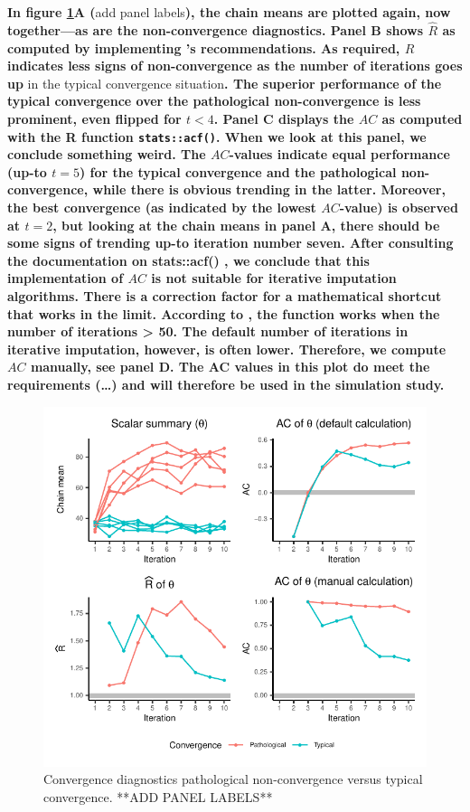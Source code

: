 \documentclass[Royal,times,sageh]{sagej}
\begin{document}
\textbf{In figure \ref{fig:diagnostics}A (}add panel labels\textbf{),
the chain means are plotted again, now together---as are the
non-convergence diagnostics. Panel B shows \(\widehat{R}\) as computed
by implementing \citet{veht19} 's recommendations. As required,
\(\widehat{R}\) indicates less signs of non-convergence as the number of
iterations goes up }in the typical convergence situation\textbf{. The
superior performance of the typical convergence over the pathological
non-convergence is less prominent, even flipped for \(t<4\). Panel C
displays the \(AC\) as computed with the R function
\texttt{stats::acf()}. When we look at this panel, we conclude something
weird. The \(AC\)-values indicate equal performance (up-to \(t=5\)) for
the typical convergence and the pathological non-convergence, while
there is obvious trending in the latter. Moreover, the best convergence
(as indicated by the lowest \(AC\)-value) is observed at \(t=2\), but
looking at the chain means in panel A, there should be some signs of
trending up-to iteration number seven. After consulting the
documentation on stats::acf() \citep{R}, we conclude that this
implementation of \(AC\) is not suitable for iterative imputation
algorithms. There is a correction factor for a mathematical shortcut
that works in the limit. According to \citet{box15}, the function works
when the number of iterations \textgreater{} 50. The default number of
iterations in iterative imputation, however, is often lower. Therefore,
we compute \(AC\) manually, see panel D. The AC values in this plot do
meet the requirements (\ldots) and will therefore be used in the
simulation study.}

\begin{figure}

{\centering \includegraphics{manuscript_files/figure-latex/diagnostics-1} 

}

\caption{Convergence diagnostics pathological non-convergence versus typical convergence. **ADD PANEL LABELS**}\label{fig:diagnostics}
\end{figure}
\end{document}
